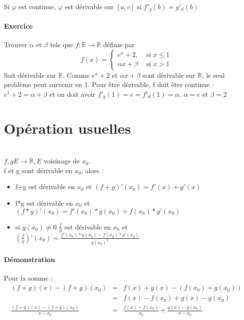 		Si $\varphi$ est continue, $\varphi$ est dérivable sur $[a, c]$ si $f'_g(b) = g'_d(b)$

		\paragraph{Exercice} Trouver $\alpha$ et $\beta$ tels que $f:\mathbb{R} \rightarrow \mathbb{R}$ définie par 
		\[f(x) = 
			\left\{
				\begin{array}{rl}
					e^x +2, & \text{ si } x \leq 1 \\
					\alpha x + \beta & \text{ si } x > 1
				\end{array}
				\right.
			\]
			Soit dérivable sur $\mathbb{R}$. Comme $e^x +2$ et $\alpha x + \beta$ sont dérivable sur $\mathbb{R}$, le seul problème peut survenir en 1.
			Pour être dérivable, f doit être continue :
			$e^1 + 2 = \alpha + \beta$ et on doit avoir $f'_g(1) = e = f'_d(1) = \alpha$. $\alpha = e$ et $\beta = 2$

			\section{Opération usuelles} ~\\
			$f, g E \rightarrow \mathbb{R}, E$ voisinage de $x_0$.
			~\\
			f et g sont dérivable en $x_0$, alors :
			\begin{itemize}
				\item f+g est dérivable en $x_0$ et $(f+g)'(x_0) = f'(x)+g'(x)$
				\item f*g est dérivable en $x_0$ et $(f*g)'(x_0) = f'(x_0)*g(x_0)+f(x_0)*g'(x_0)$
				\item si $g(x_0) \neq 0$ $\frac{f}{g}$ est dérivable en $x_0$ et $(\frac{f}{g})'(x_0) = \frac{f'(x_0)*g(x_0)-f(x_0)*g'(x_0)}{g(x_0)^2}$
			\end{itemize}

			\paragraph{Démonstration} 
			Pour la somme : 
			\[\begin{array}{rcl}
				(f+g)(x) - (f+g)(x_0) &=& f(x)+g(x) - (f(x_0)+g(x_0)) \\
																							   &=& f(x) - f(x_0) + g(x) - g(x_0) \\
				\frac{(f+g)(x)-(f+g)(x_0)}{x-x_0} &=& \frac{f(x) - f(x_0)}{x_0} + \frac{g(x) - g(x_0)}{x-x_0}
		\end{array}\]


